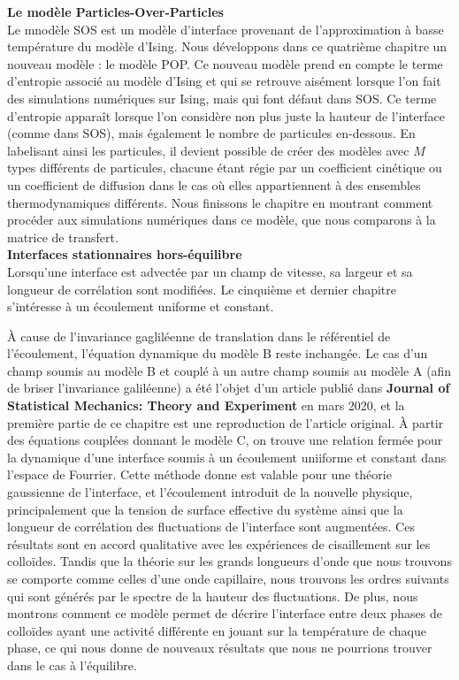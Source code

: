 {\bf \large Le modèle Particles-Over-Particles} \\

Le mnodèle SOS est un modèle d'interface provenant de l'approximation à basse température du modèle d'Ising. Nous développons dans ce quatrième chapitre un nouveau modèle : le modèle POP. Ce nouveau modèle prend en compte le terme d'entropie associé au modèle d'Ising et qui se retrouve aisément lorsque l'on fait des simulations numériques sur Ising, mais qui font défaut dans SOS. Ce terme d'entropie apparaît lorsque l'on considère non plus juste la hauteur de l'interface (comme dans SOS), mais également le nombre de particules en-dessous. En labelisant ainsi les particules, il devient possible de créer des modèles avec $M$ types différents de particules, chacune étant régie par un coefficient cinétique ou un coefficient de diffusion dans le cas où elles appartiennent à des ensembles thermodynamiques différents. Nous finissons le chapitre en montrant comment procéder aux simulations numériques dans ce modèle, que nous comparons à la matrice de transfert. \\

{\bf \large Interfaces stationnaires hors-équilibre} \\

Lorsqu'une interface est advectée par un champ de vitesse, sa largeur et sa longueur de corrélation sont modifiées. Le cinquième et dernier chapitre s'intéresse à un écoulement uniforme et constant. 

À cause de l'invariance gagliléenne de translation dans le référentiel de l'écoulement, l'équation dynamique du modèle B reste inchangée. Le cas d'un champ soumis au modèle B et couplé à un autre champ soumis au modèle A (afin de briser l'invariance galiléenne) a été l'objet d'un article publié dans {\bf Journal of Statistical Mechanics: Theory and Experiment} en mars 2020, et la première partie de ce chapitre est une reproduction de l'article original. À partir des équations couplées donnant le modèle C, on trouve une relation fermée pour la dynamique d'une interface soumis à un écoulement uniiforme et constant dans l'espace de Fourrier. Cette méthode donne est valable pour une théorie gaussienne de l'interface, et l'écoulement introduit de la nouvelle physique, principalement que la tension de surface effective du système ainsi que la longueur de corrélation des fluctuations de l'interface sont augmentées. Ces résultats sont en accord qualitative avec les expériences de cisaillement sur les colloïdes. Tandis que la théorie sur les grands longueurs d'onde que nous trouvons se comporte comme celles d'une onde capillaire, nous trouvons les ordres suivants qui sont générés par le spectre de la hauteur des fluctuations. De plus, nous montrons comment ce modèle permet de décrire l'interface entre deux phases de colloïdes ayant une activité différente en jouant sur la température de chaque phase, ce qui nous donne de nouveaux résultats que nous ne pourrions trouver dans le cas à l'équilibre.


